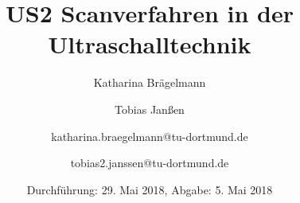 
\title{US2 Scanverfahren in der Ultraschalltechnik}
\author{Katharina Brägelmann \and Tobias Janßen \and katharina.braegelmann@tu-dortmund.de \and tobias2.janssen@tu-dortmund.de}
\date{Durchführung: 29. Mai 2018, Abgabe: 5. Mai 2018}
\maketitle

\tableofcontents
